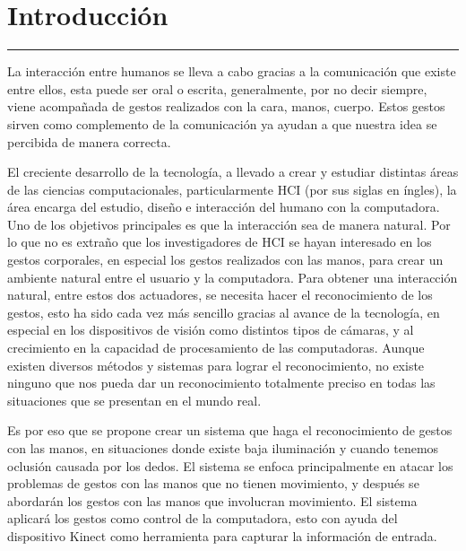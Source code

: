 \chapter{Introducci\'on}\label{capit:cap1}
\vspace{-2.0325ex}%
\noindent
\rule{\textwidth}{0.5pt}
\vspace{-5.5ex}%
\newcommand{\pushline}{\Indp}%

La interacci\'on entre humanos se lleva a cabo gracias a la comunicaci\'on  que existe entre ellos, esta puede ser oral o escrita, generalmente, por no decir siempre, viene acompa\~nada de gestos realizados con la cara, manos, cuerpo. 
Estos gestos sirven como complemento de la comunicaci\'on ya ayudan a que nuestra idea se percibida de manera correcta.


El creciente desarrollo de la tecnolog\'ia, a llevado  a crear y estudiar distintas \'areas de las ciencias computacionales, particularmente HCI (por sus siglas en \'ingles), la \'area encarga del estudio, dise\~no  e interacci\'on del humano con la computadora. 
Uno de los objetivos principales es que la interacci\'on sea de manera natural. 
Por lo que no es extra\~no que los investigadores de HCI se hayan interesado en los gestos corporales, en especial los gestos realizados con las manos, para crear un ambiente natural entre el usuario y la computadora. 
Para obtener una interacci\'on natural, entre estos dos actuadores, se necesita hacer el reconocimiento de los gestos, esto ha sido cada vez m\'as sencillo gracias al avance de la tecnolog\'ia, en especial en los dispositivos de visi\'on como distintos tipos de c\'amaras, y al crecimiento en la capacidad de procesamiento de las computadoras. 
Aunque existen diversos m\'etodos y sistemas para lograr el reconocimiento, no existe ninguno que nos pueda dar un reconocimiento totalmente preciso en todas las situaciones que se presentan en el mundo real.  


Es por eso que se propone crear un sistema que haga el reconocimiento de gestos con las manos, en situaciones donde existe baja iluminaci\'on y cuando tenemos oclusi\'on causada por los dedos. 
El sistema se enfoca principalmente en atacar los problemas de gestos con las manos que no tienen movimiento, y despu\'es se abordar\'an los gestos con las manos que involucran movimiento. El sistema aplicar\'a los gestos como control de la computadora, esto con ayuda del dispositivo Kinect como  herramienta para capturar la informaci\'on de entrada. 
  

